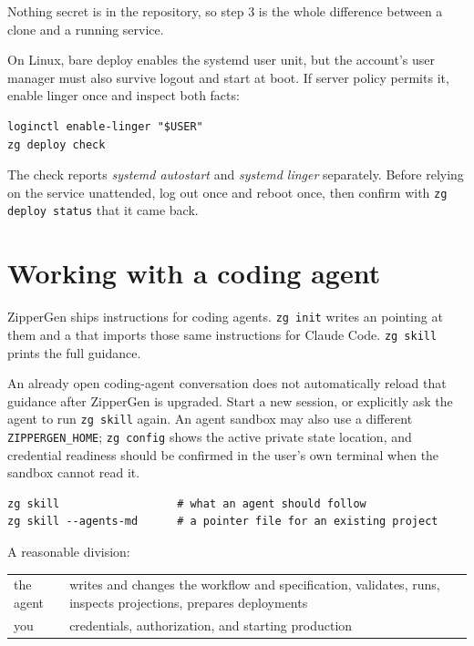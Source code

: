 \documentclass[11pt,a4paper]{article}
\begin{document}
Nothing secret is in the repository, so step 3 is the whole difference between
a clone and a running service.

On Linux, bare deploy enables the systemd user unit, but the account's user
manager must also survive logout and start at boot. If server policy permits
it, enable linger once and inspect both facts:

\begin{lstlisting}[style=shell]
loginctl enable-linger "$USER"
zg deploy check
\end{lstlisting}

The check reports \emph{systemd autostart} and \emph{systemd linger}
separately. Before relying on the service unattended, log out once and reboot
once, then confirm with \texttt{zg deploy status} that it came back.

\section{Working with a coding agent}

ZipperGen ships instructions for coding agents. \texttt{zg init} writes an
 pointing at them and a  that imports those
same instructions for Claude Code. \texttt{zg skill} prints the full guidance.

An already open coding-agent conversation does not automatically reload that
guidance after ZipperGen is upgraded. Start a new session, or explicitly ask
the agent to run \texttt{zg skill} again. An agent sandbox may also use a
different \texttt{ZIPPERGEN\_HOME}; \texttt{zg config} shows the active private
state location, and credential readiness should be confirmed in the user's own
terminal when the sandbox cannot read it.

\begin{lstlisting}[style=shell]
zg skill                  # what an agent should follow
zg skill --agents-md      # a pointer file for an existing project
\end{lstlisting}

A reasonable division:

\begin{center}
\begin{tabularx}{0.95\linewidth}{@{}lX@{}}
\toprule
the agent & writes and changes the workflow and specification, validates,
runs, inspects projections, prepares deployments \\
you & credentials, authorization, and starting production \\
\bottomrule
\end{tabularx}
\end{center}
\end{document}

